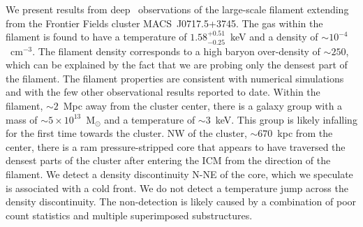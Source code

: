 We present results from deep \chandra\ observations of the large-scale filament extending from the Frontier Fields cluster MACS~J0717.5+3745. The gas within the filament is found to have a temperature of $1.58_{-0.25}^{+0.51}$~keV and a density of $\sim 10^{-4}$~cm$^{-3}$. The filament density corresponds to a high baryon over-density of $\sim 250$, which can be explained by the fact that we are probing only the densest part of the filament. The filament properties are consistent with numerical simulations and with the few other observational results reported to date. Within the filament, $\sim 2$~Mpc away from the cluster center, there is a galaxy group with a mass of $\sim 5\times 10^{13}$~M$_\odot$ and a temperature of $\sim 3$~keV. This group is likely infalling for the first time towards the cluster. NW of the cluster, $\sim 670$~kpc from the center, there is a ram pressure-stripped core that appears to have traversed the densest parts of the cluster after entering the ICM from the direction of the filament. We detect a density discontinuity N-NE of the core, which we speculate is associated with a cold front. We do not detect a temperature jump across the density discontinuity. The non-detection is likely caused by a combination of poor count statistics and multiple superimposed substructures.